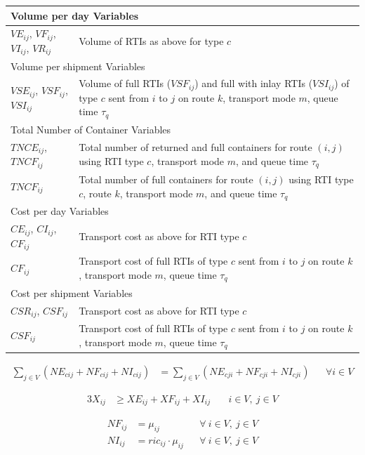 \begin{longtable}{|p{}|p{}|}
\hline
\multicolumn{2}{|l|}{Volume per day Variables}\\ \hline
$VE_{ij}$, $VF_{ij}$, $VI_{ij}$, $VR_{ij}$ & Volume of RTIs as above for type $c$ \\
\hline
\multicolumn{2}{|l|}{Volume per shipment Variables}\\ \hline
$VSE_{ij}$, $VSF_{ij}$, $VSI_{ij}$ & Volume of full RTIs ($VSF_{ij}$) and full with inlay RTIs ($VSI_{ij}$) of type $c$ sent from $i$ to $j$ on route $k$, transport mode $m$, queue time $\tau_q$ \\
\hline
\multicolumn{2}{|l|}{Total Number of Container Variables}\\ \hline
$TNCE_{ij}$, $TNCF_{ij}$ & Total number of returned and full containers for route $(i,j)$ using RTI type $c$, transport mode $m$, and queue time $\tau_q$ \\
$TNCF_{ij}$ & Total number of full containers for route $(i,j)$ using RTI type $c$, route $k$, transport mode $m$, and queue time $\tau_q$ \\
\hline
\multicolumn{2}{|l|}{Cost per day Variables}\\ \hline
$CE_{ij}$, $CI_{ij}$,  $CF_{ij}$ & Transport cost as above for RTI type $c$ \\
$CF_{ij}$ & Transport cost of full RTIs of type $c$ sent from $i$ to $j$ on route $k$, transport mode $m$, queue time $\tau_q$ \\ \hline
\multicolumn{2}{|l|}{Cost per shipment Variables}\\ \hline
$CSR_{ij}$, $CSF_{ij}$ & Transport cost as above for RTI type $c$ \\
$CSF_{ij}$ & Transport cost of full RTIs of type $c$ sent from $i$ to $j$ on route $k$, transport mode $m$, queue time $\tau_q$ \\ \hline
\end{longtable}

\begin{align}
    \sum_{j \in V} (NE_{cij} + NF_{cij} + NI_{cij}) 
    &= \sum_{j \in V} (NE_{cji} + NF_{cji} + NI_{cji}) 
    && \forall i \in V
    \label{eq:node_flow}
\end{align}

\begin{align}
    3 X_{ij} &\geq XE_{ij} + XF_{ij} + XI_{ij} 
    && \ i \in V,\ j \in V 
\end{align}

\begin{align}
  NF_{ij} &= \mu_{ij} && \forall \ i \in V,\ j \in V  \\
  NI_{ij} &= ric_{ij}\cdot\mu_{ij} && \forall \ i \in V,\ j \in V 
\end{align}


